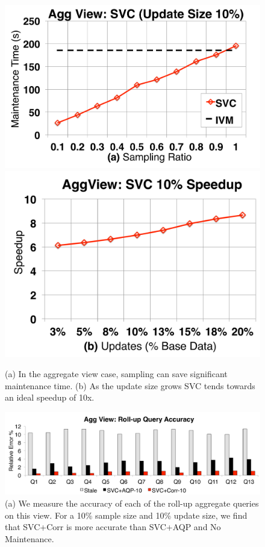 \begin{figure}[t]\vspace{-2em}
\centering
 \includegraphics[scale=0.13]{exp/msdc_1.pdf}
 \includegraphics[scale=0.13]{exp/msdc_2.pdf}\vspace{-.5em}
   \caption{(a) In the aggregate view case, sampling can save significant maintenance time. (b) As the update size grows SVC tends towards an ideal speedup of 10x.\label{exp2-acc-sample}}
\end{figure}


\begin{figure}[t]
\centering
 \includegraphics[scale=0.13]{exp/msdc_3.pdf}\vspace{-.5em}
   \caption{(a) We measure the accuracy of each of the roll-up aggregate queries on this view. For a 10\% sample size and 10\% update size, we find that SVC+Corr is more accurate than SVC+AQP and No Maintenance.\vspace{-.5em}\label{exp2-acc-sample2}}
\end{figure}



